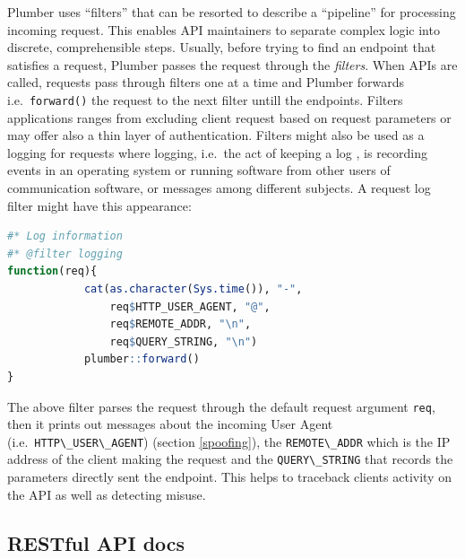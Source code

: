 \documentclass[
  12pt,
  a4paper,
  oneside]{book}
\newcommand{\passthrough}[1]{#1}
\theoremstyle{definition}
\theoremstyle{definition}
\theoremstyle{definition}
\theoremstyle{remark}
\begin{document}
Plumber uses ``filters'' that can be resorted to describe a ``pipeline'' for processing incoming request. This enables API maintainers to separate complex logic into discrete, comprehensible steps. Usually, before trying to find an endpoint that satisfies a request, Plumber passes the request through the \emph{filters}. When APIs are called, requests pass through filters one at a time and Plumber forwards i.e.~\passthrough{\lstinline!forward()!} the request to the next filter untill the endpoints. Filters applications ranges from excluding client request based on request parameters or may offer also a thin layer of authentication. Filters might also be used as a logging for requests where logging, i.e.~the act of keeping a log \citep{wiki:logging}, is recording events in an operating system or running software from other users of communication software, or messages among different subjects.
A request log filter might have this appearance:

\begin{lstlisting}[language=R]
#* Log information
#* @filter logging
function(req){
            cat(as.character(Sys.time()), "-",
                req$HTTP_USER_AGENT, "@", 
                req$REMOTE_ADDR, "\n",
                req$QUERY_STRING, "\n")
            plumber::forward()
}
\end{lstlisting}

The above filter parses the request through the default request argument \passthrough{\lstinline!req!}, then it prints out messages about the incoming User Agent (i.e.~\passthrough{\lstinline!HTTP\_USER\_AGENT!}) (section \ref{spoofing}), the \passthrough{\lstinline!REMOTE\_ADDR!} which is the IP address of the client making the request \citeyearpar{plumber} and the \passthrough{\lstinline!QUERY\_STRING!} that records the parameters directly sent the endpoint. This helps to traceback clients activity on the API as well as detecting misuse.

\hypertarget{docs}{%
\subsection{RESTful API docs}\label{docs}}
\end{document}
